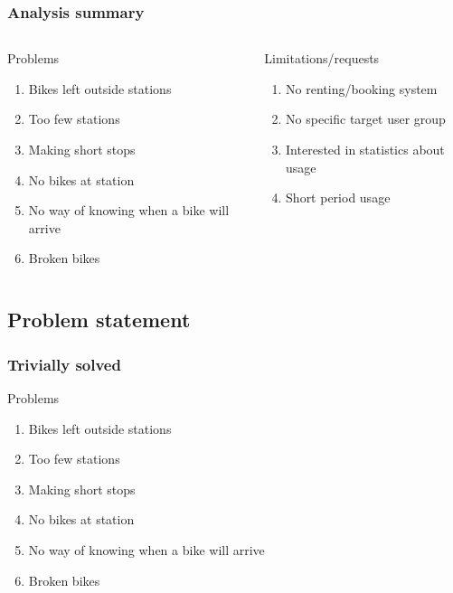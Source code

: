 \begin{frame}
\frametitle{Analysis summary}
\begin{columns}
\begin{column}{.45\textwidth}
\begin{block}{Problems}
\begin{enumerate}
\item Bikes left outside stations
\item Too few stations
\item Making short stops
\item No bikes at station
\item No way of knowing when a bike will arrive
\item Broken bikes
\end{enumerate}
\end{block}
\end{column}
\begin{column}{.45\textwidth}
\begin{block}{Limitations/requests}
\begin{enumerate}
\item No renting/booking system
\item No specific target user group
\item Interested in statistics about usage
\item Short period usage
\end{enumerate}
\end{block}
\end{column}
\end{columns}
\end{frame}

\subsection{Problem statement}

\begin{frame}
\frametitle{Trivially solved}
\begin{block}{Problems}
\begin{enumerate}
\item<1> Bikes left outside stations
\item<1> Too few stations
\item<1> Making short stops
\item<1> No bikes at station
\item<2> No way of knowing when a bike will arrive
\item<1> Broken bikes
\end{enumerate}
\end{block}
\end{frame}

